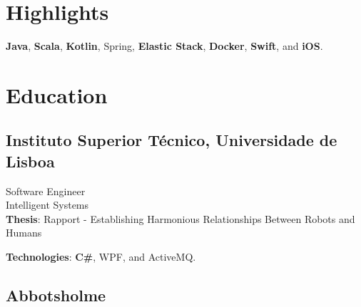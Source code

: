 \documentclass[letterpaper]{deedy-resume} %
\begin{document}
\begin{minipage}[t]{0.33\textwidth} %


\section{Highlights}
\textbf{Java}, \textbf{Scala}, \textbf{Kotlin}, Spring, \textbf{Elastic Stack}, \textbf{Docker}, \textbf{Swift}, and \textbf{iOS}.

\section{Education} 

\subsection{Instituto Superior Técnico, Universidade de Lisboa }

Software Engineer\\
Intelligent Systems \\
\vspace{\topsep}
\vspace{\topsep}
\textbf{Thesis}: Rapport - Establishing Harmonious Relationships Between Robots and Humans \\
\vspace{\topsep}

\textbf{Technologies}: \textbf{C\#}, WPF, and ActiveMQ.

\sectionspace %


\vspace{\topsep}

\sectionspace %

\subsection{Abbotsholme}


\end{minipage}
\end{document}

